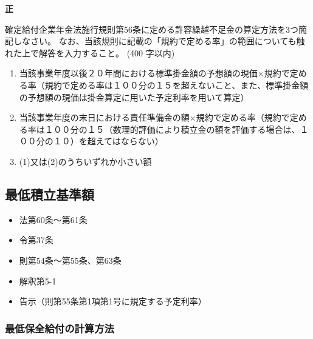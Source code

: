 \begin{answerbox}
  \textbf{正}
\end{answerbox}

\begin{shortanswer}[年金2 2024 問題2(1)]
  確定給付企業年金法施行規則第56条に定める許容繰越不足金の算定方法を3つ簡記しなさい。 
  なお、当該規則に記載の「規約で定める率」の範囲についても触れた上で解答を入力すること。
   (400 字以内)
\end{shortanswer}

\begin{answerbox}
  \begin{enumerate}[(1)]
    \item 当該事業年度以後２０年間における標準掛金額の予想額の現価×規約で定める率（規約で定める率は１００分の１５を超えないこと、また、標準掛金額の予想額の現価は掛金算定に用いた予定利率を用いて算定）
    \item 当該事業年度の末日における責任準備金の額×規約で定める率（規約で定める率は１００分の１５（数理的評価により積立金の額を評価する場合は、１００分の１０）を超えてはならない）
    \item (1)又は(2)のうちいずれか小さい額
  \end{enumerate}
\end{answerbox}

\newpage

\subsection{最低積立基準額}

\begin{InyouJobunbox}
  \begin{itemize}
    \item 法第60条〜第61条
    \item 令第37条
    \item 則第54条〜第55条、第63条
    \item 解釈第5-1
    \item 告示（則第55条第1項第1号に規定する予定利率）
  \end{itemize}
\end{InyouJobunbox}

\subsubsection{最低保全給付の計算方法}


